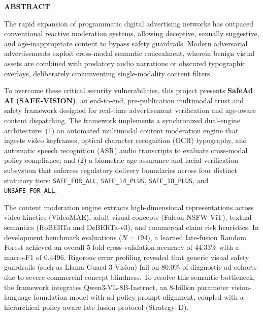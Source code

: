 \documentclass[12pt,a4paper]{report}
\begin{document}
\newpage
{}
\setcounter{page}{1}

\begin{center}
{\bf \Large ABSTRACT}
\end{center}

\vspace{0.5cm}

\noindent The rapid expansion of programmatic digital advertising networks has outpaced conventional reactive moderation systems, allowing deceptive, sexually suggestive, and age-inappropriate content to bypass safety guardrails. Modern adversarial advertisements exploit cross-modal semantic concealment, wherein benign visual assets are combined with predatory audio narrations or obscured typographic overlays, deliberately circumventing single-modality content filters. 

To overcome these critical security vulnerabilities, this project presents \textbf{SafeAd AI (SAFE-VISION)}, an end-to-end, pre-publication multimodal trust and safety framework designed for real-time advertisement verification and age-aware content dispatching. The framework implements a synchronized dual-engine architecture: (1) an automated multimodal content moderation engine that ingests video keyframes, optical character recognition (OCR) typography, and automatic speech recognition (ASR) audio transcripts to evaluate cross-modal policy compliance; and (2) a biometric age assurance and facial verification subsystem that enforces regulatory delivery boundaries across four distinct statutory tiers: \texttt{SAFE\_FOR\_ALL}, \texttt{SAFE\_14\_PLUS}, \texttt{SAFE\_18\_PLUS}, and \texttt{UNSAFE\_FOR\_ALL}.

The content moderation engine extracts high-dimensional representations across video kinetics (VideoMAE), adult visual concepts (Falcon NSFW ViT), textual semantics (RoBERTa and DeBERTa-v3), and commercial claim risk heuristics. In development benchmark evaluations ($N=194$), a learned late-fusion Random Forest achieved an overall 5-fold cross-validation accuracy of $44.33\%$ with a macro-F1 of $0.4496$. Rigorous error profiling revealed that generic visual safety guardrails (such as Llama Guard 3 Vision) fail on $80.0\%$ of diagnostic ad cohorts due to severe commercial concept blindness. To resolve this semantic bottleneck, the framework integrates Qwen3-VL-8B-Instruct, an 8-billion parameter vision-language foundation model with ad-policy prompt alignment, coupled with a hierarchical policy-aware late-fusion protocol (Strategy~D).
\end{document}
